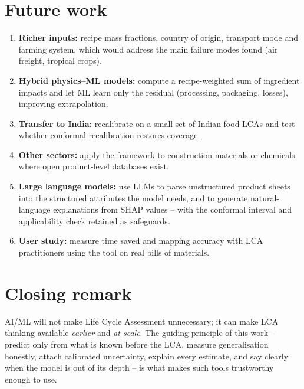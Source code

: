 \section{Future work}

\begin{enumerate}
  \item \textbf{Richer inputs:} recipe mass fractions, country of origin, transport mode and farming
  system, which would address the main failure modes found (air freight, tropical crops).
  \item \textbf{Hybrid physics--ML models:} compute a recipe-weighted sum of ingredient impacts and
  let ML learn only the residual (processing, packaging, losses), improving extrapolation.
  \item \textbf{Transfer to India:} recalibrate on a small set of Indian food LCAs and test whether
  conformal recalibration restores coverage.
  \item \textbf{Other sectors:} apply the framework to construction materials or chemicals where open
  product-level databases exist.
  \item \textbf{Large language models:} use LLMs to parse unstructured product sheets into the
  structured attributes the model needs, and to generate natural-language explanations from SHAP
  values -- with the conformal interval and applicability check retained as safeguards.
  \item \textbf{User study:} measure time saved and mapping accuracy with LCA practitioners using
  the tool on real bills of materials.
\end{enumerate}

\section{Closing remark}

AI/ML will not make Life Cycle Assessment unnecessary; it can make LCA thinking available
\emph{earlier} and \emph{at scale}. The guiding principle of this work -- predict only from what is
known before the LCA, measure generalisation honestly, attach calibrated uncertainty, explain every
estimate, and say clearly when the model is out of its depth -- is what makes such tools
trustworthy enough to use.
